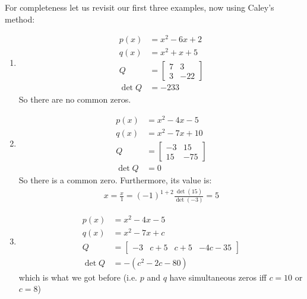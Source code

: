 For completeness let us revisit our first three examples, now using
Caley's method:
\begin{enumerate}
\item
  \begin{align*}
    p(x) &= x^2 - 6x + 2 \\
    q(x) &= x^2 + x + 5 \\
    Q &=
        \begin{bmatrix}
          7 & 3 \\ 3 & -22
        \end{bmatrix} \\
    \det Q &= -233
  \end{align*}
  So there are no common zeros.
\item
  \begin{align*}
    p(x) &= x^2 - 4x - 5\\
    q(x) &= x^2 - 7x + 10 \\
    Q &=
        \begin{bmatrix}
          -3 & 15 \\ 15 & -75
        \end{bmatrix} \\
    \det Q &= 0 
  \end{align*}
  So there is a common zero. Furthermore, its value is:
  \begin{align*}
    x = \frac{x}{1} = (-1)^{1+2} \frac{\det(15)}{\det(-3)} = 5
  \end{align*}
\item
  \begin{align*}
    p(x) &= x^2 - 4x - 5 \\
    q(x) &= x^2 - 7x + c \\
    Q &=
        \begin{bmatrix}
          -3 & c+5 & c+5 & -4c-35
        \end{bmatrix} \\
    \det Q &= -(c^2 - 2c - 80)
  \end{align*}
  which is what we got before (i.e. $p$ and $q$ have simultaneous
  zeros iff $c = 10$ or $c = 8$)
\end{enumerate}
